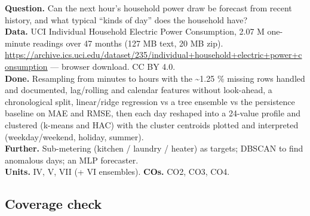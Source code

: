 \documentclass[11pt]{article}
\begin{document}
\textbf{Question.} Can the next hour's household power draw be forecast from recent history, and what typical ``kinds of day'' does the household have?\\
\textbf{Data.} UCI Individual Household Electric Power Consumption, 2.07 M one-minute readings over 47 months (127 MB text, 20 MB zip). \url{https://archive.ics.uci.edu/dataset/235/individual+household+electric+power+consumption} --- browser download. CC BY 4.0.\\
\textbf{Done.} Resampling from minutes to hours with the \textasciitilde1.25 \% missing rows handled and documented, lag/rolling and calendar features without look-ahead, a chronological split, linear/ridge regression vs a tree ensemble vs the persistence baseline on MAE and RMSE, then each day reshaped into a 24-value profile and clustered (k-means and HAC) with the cluster centroids plotted and interpreted (weekday/weekend, holiday, summer).\\
\textbf{Further.} Sub-metering (kitchen / laundry / heater) as targets; DBSCAN to find anomalous days; an MLP forecaster.\\
\textbf{Units.} IV, V, VII (+ VI ensembles). \textbf{COs.} CO2, CO3, CO4.



\hypertarget{coverage-check}{%
\subsection{Coverage check}\label{coverage-check}}
\end{document}
